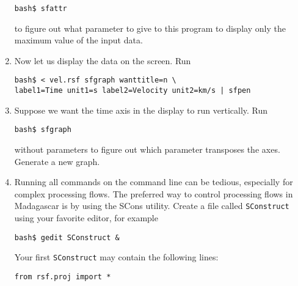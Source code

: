 \begin{enumerate}
\begin{verbatim}
bash$ sfattr
\end{verbatim}
to figure out what parameter to give to this program to display only the maximum value of the input data.
\item Now let us display the data on the screen. Run
\begin{verbatim}
bash$ < vel.rsf sfgraph wanttitle=n \
label1=Time unit1=s label2=Velocity unit2=km/s | sfpen
\end{verbatim}
\item Suppose we want the time axis in the display to run vertically. Run
\begin{verbatim}
bash$ sfgraph
\end{verbatim}
without parameters to figure out which parameter transposes the axes. Generate a new graph.
\item Running all commands on the command line can be tedious, especially for complex processing flows. The preferred way to control processing flows in Madagascar is by using the SCons utility. Create a file called \texttt{SConstruct} using your favorite editor, for example
\begin{verbatim}
bash$ gedit SConstruct &
\end{verbatim}
Your first \texttt{SConstruct} may contain the following lines:
\lstset{language=python,numbers=left,numberstyle=\tiny,showstringspaces=false}
\begin{lstlisting}[frame=single]
from rsf.proj import *


\end{lstlisting}
\end{enumerate}
